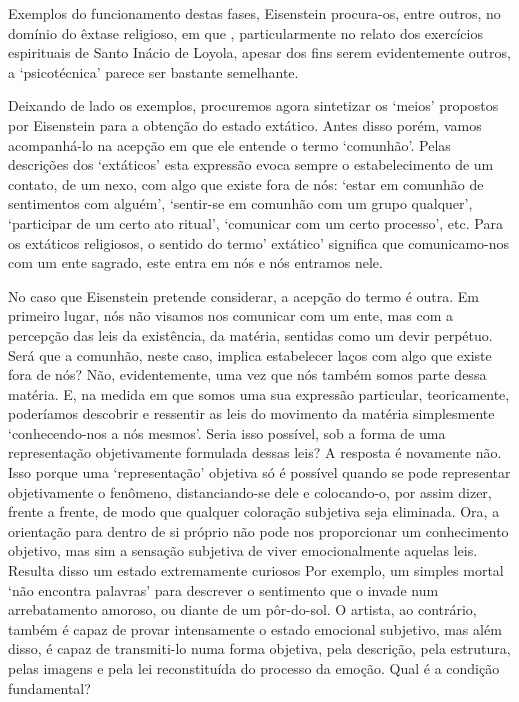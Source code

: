 Exemplos do funcionamento destas fases, Eisenstein procura-os, entre
outros, no domínio do êxtase religioso, em que , particularmente no
relato dos exercícios espirituais de Santo Inácio de Loyola, apesar dos
fins serem evidentemente outros, a `psicotécnica' parece ser bastante
semelhante.

Deixando de lado os exemplos, procuremos agora sintetizar os `meios'
propostos por Eisenstein para a obtenção do estado extático. Antes disso
porém, vamos acompanhá-lo na acepção em que ele entende o termo
`comunhão'. Pelas descrições dos `extáticos' esta expressão evoca sempre
o estabelecimento de um contato, de um nexo, com algo que existe fora de
nós: `estar em comunhão de sentimentos com alguém', `sentir-se em
comunhão com um grupo qualquer', `participar de um certo ato ritual',
`comunicar com um certo processo', etc. Para os extáticos religiosos, o
sentido do termo' extático' significa que comunicamo-nos com um ente
sagrado, este entra em nós e nós entramos nele.

No caso que Eisenstein pretende considerar, a acepção do termo é outra.
Em primeiro lugar, nós não visamos nos comunicar com um ente, mas com a
percepção das leis da existência, da matéria, sentidas como um devir
perpétuo. Será que a comunhão, neste caso, implica estabelecer laços com
algo que existe fora de nós? Não, evidentemente, uma vez que nós também
somos parte dessa matéria. E, na medida em que somos uma sua expressão
particular, teoricamente, poderíamos descobrir e ressentir as leis do
movimento da matéria simplesmente `conhecendo-nos a nós mesmos'. Seria
isso possível, sob a forma de uma representação objetivamente formulada
dessas leis? A resposta é novamente não. Isso porque uma `representação'
objetiva só é possível quando se pode representar objetivamente o
fenômeno, distanciando-se dele e colocando-o, por assim dizer, frente a
frente, de modo que qualquer coloração subjetiva seja eliminada. Ora, a
orientação para dentro de si próprio não pode nos proporcionar um
conhecimento objetivo, mas sim a sensação subjetiva de viver
emocionalmente aquelas leis. Resulta disso um estado extremamente
curiosos Por exemplo, um simples mortal `não encontra palavras' para
descrever o sentimento que o invade num arrebatamento amoroso, ou diante
de um pôr-do-sol. O artista, ao contrário, também é capaz de provar
intensamente o estado emocional subjetivo, mas além disso, é capaz de
transmiti-lo numa forma objetiva, pela descrição, pela estrutura, pelas
imagens e pela lei reconstituída do processo da emoção. Qual é a
condição fundamental?

